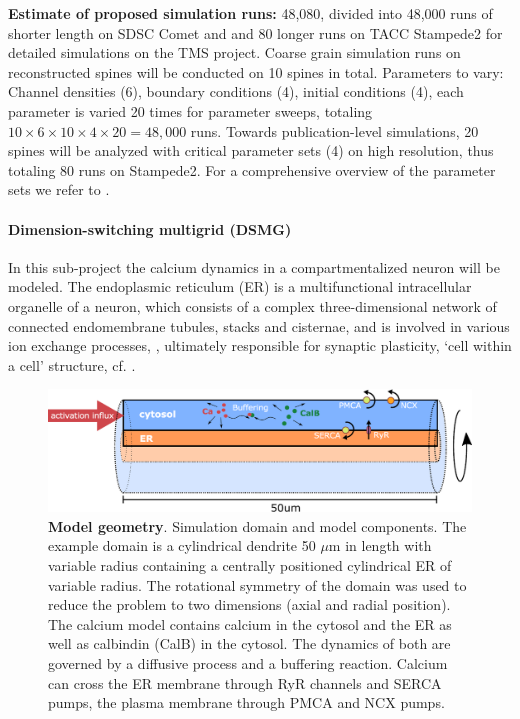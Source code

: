 \noindent \textbf{Estimate of proposed simulation runs:} 48,080, divided into 48,000 runs of shorter 
length on SDSC Comet and and 80 longer runs on TACC Stampede2 for detailed simulations on the TMS project. 
Coarse grain simulation runs on reconstructed spines will be conducted on 10 spines in total.
Parameters to vary: Channel densities (6), boundary conditions (4), initial conditions (4),
each parameter is varied 20 times for parameter sweeps, totaling $10 \times 6 \times 10 \times 4
\times 20 = 48,000$ runs. Towards publication-level simulations, 20 spines will be analyzed with critical parameter sets (4) on high
resolution, thus totaling 80 runs on Stampede2. For a comprehensive overview of the parameter sets we refer to \cite{Breit2018b}.

\paragraph{Dimension-switching multigrid (DSMG)}
In this sub-project the calcium dynamics in a compartmentalized neuron will be modeled.
The endoplasmic reticulum (ER) is a multifunctional intracellular organelle of a neuron,
which consists of a complex three-dimensional network of connected endomembrane
tubules, stacks and cisternae, and is involved in various ion exchange processes,
\cite{Breit2018}, ultimately responsible for synaptic plasticity, `cell within a cell'
structure, cf. \cite{Berridge1998}.

\begin{figure}
\centering
\includegraphics[scale=0.25]{inc/img/schematics.png}
\caption{\textbf{Model geometry}. Simulation domain and model components. The example domain is a cylindrical dendrite 50 $\mu$m in length with variable radius containing a centrally positioned cylindrical ER of variable radius. The rotational symmetry of the domain was used to reduce the problem to two dimensions (axial and radial position). The calcium model contains calcium in the cytosol and the ER as well as calbindin (CalB) in the cytosol. The dynamics of both are governed by a diffusive process and a buffering reaction. Calcium can cross the ER membrane through RyR channels and SERCA pumps, the plasma membrane through PMCA and NCX pumps.}
\label{fig:schematics}
\end{figure}

